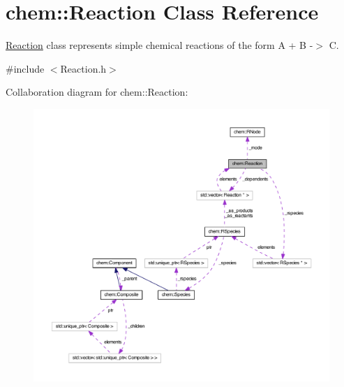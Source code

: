 \hypertarget{classchem_1_1Reaction}{\section{chem\-:\-:Reaction Class Reference}
\label{classchem_1_1Reaction}
}


\hyperlink{classchem_1_1Reaction}{Reaction} class represents simple chemical reactions of the form A + B -\/$>$ C.  




{\ttfamily \#include $<$Reaction.\-h$>$}



Collaboration diagram for chem\-:\-:Reaction\-:\nopagebreak
\begin{figure}[H]
\begin{center}
\leavevmode
\includegraphics[width=350pt]{classchem_1_1Reaction__coll__graph}
\end{center}
\end{figure}
